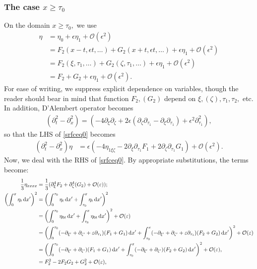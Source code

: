 \documentclass[10pt,reqno,oneside,a4paper, landscape]{article}
\begin{document}
\subsubsection{The case $x\geq \tau_0$}
On the domain $x\geq \tau_0,$ we use 
\begin{align*}
\eta &= \eta_0 + \epsilon \eta_1 + \mathcal{O}(\epsilon^2)  \\
&= F_2(x-t, \epsilon t, \ldots) + G_2(x+t, \epsilon t, \ldots) + \epsilon \eta_1 + \mathcal{O}(\epsilon^2) \\
&= F_2(\xi, \tau_1, \ldots) + G_2(\zeta, \tau_1, \ldots) + \epsilon \eta_1 + \mathcal{O}(\epsilon^2) \\
&= F_2+G_2 + \epsilon \eta_1 +  \mathcal{O}(\epsilon^2).
\end{align*}
For ease of writing, we suppress explicit dependence on variables, though the reader should bear in mind that function $F_2, (G_2)$ depend on $\xi, (\zeta), \tau_1, \tau_2,$ etc. In addition, D'Alembert operator becomes 
\begin{align*}
(\partial_t^2 - \partial_x^2) = \left( - 4\partial_\xi \partial_\zeta + 2\epsilon(\partial_\zeta \partial_{\tau_1} - \partial_\xi\partial_{\tau_1}) + \epsilon^2 \partial_{\tau_1}^2 \right),
\end{align*}
so that the LHS of \eqref{srfceq0} becomes
\begin{align}
(\partial_t^2 - \partial_x^2) \eta &= \epsilon \left(- 4\eta_{1\xi \zeta} - 2\partial_{\xi}\partial_{\tau_1} F_1 + 2\partial_{\zeta}\partial_{\tau_1}G_1\right) + \mathcal{O}(\epsilon^2). \label{LHS1-2}
\end{align}
Now, we deal with the RHS of \eqref{srfceq0}. By appropriate substitutions, the terms become:
\begin{align*}
\frac{1}{3}\eta_{xxxx} &= \frac{1}{3}(\partial_\xi^4 F_2 + \partial_\zeta^4(G_2)+ \mathcal{O}(\varepsilon)); \\
\left( \int^{x}_{0} \eta_t \,\mathrm{d} x' \right)^2 &= \left( \int^{\tau_0}_{0} \eta_t \,\mathrm{d} x' + \int_{\tau_0}^{x} \eta_t \,\mathrm{d} x' \right)^2 \\
&= \left( \int^{\tau_0}_{0} \eta_{0t} \,\mathrm{d} x' + \int_{\tau_0}^{x} \eta_{0t} \,\mathrm{d} x' \right)^2 + \mathcal{O}(\varepsilon) \\ 
&= \left( \int^{\tau_0}_{0} (-\partial_{\xi'} + \partial_{\zeta'} + \varepsilon \partial_{\tau_1}) (F_1+G_1) \,\mathrm{d} x' + \int_{\tau_0}^{x} (-\partial_{\xi'} + \partial_{\zeta'} + \varepsilon \partial_{\tau_1}) (F_2+G_2) \,\mathrm{d} x' \right)^2 + \mathcal{O}(\varepsilon) \\
&= \left( \int^{\tau_0}_{0} (-\partial_{\xi'} + \partial_{\zeta'}) (F_1+G_1) \,\mathrm{d} x' + \int_{\tau_0}^{x} (-\partial_{\xi'} + \partial_{\zeta'}) (F_2+G_2) \,\mathrm{d} x' \right)^2 + \mathcal{O}(\varepsilon), \\
&= F^2_2 - 2F_2 G_2 + G_2^2 + \mathcal{O}(\varepsilon),
\end{align*}
\end{document}
